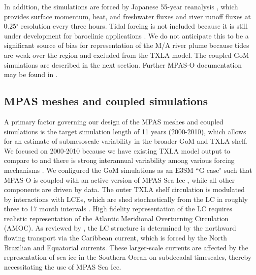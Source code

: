 In addition, the simulations are forced by Japanese 55-year reanalysis \citep[JRA-55, ][]{kobayashi2015jra}, which provides surface momentum, heat, and freshwater fluxes and river runoff fluxes at 0.25$^\circ$ resolution every three hours. Tidal forcing is not included because it is still under development for baroclinic applications \citep{barton2022global}. We do not anticipate this to be a significant source of bias for representation of the M/A river plume because tides are weak over the region \citep{DiMarco_1998} and excluded from the TXLA model. The coupled GoM simulations are described in the next section. Further MPAS-O documentation may be found in \cite{petersen2018mpas}.

\subsection{MPAS meshes and coupled simulations}
A primary factor governing our design of the MPAS meshes and coupled simulations is the target simulation length of 11 years (2000-2010), which allows for an estimate of submesoscale variability in the broader GoM and TXLA shelf. We focused on 2000-2010 because we have existing TXLA model output to compare to and there is strong interannual variability among various forcing mechanisms \citep[see Tab. 2 of ][]{forrest2011multivariable}. We configured the GoM simulations as an E3SM ``G case" such that MPAS-O is coupled with an active version of MPAS Sea Ice \citep{petersen2019evaluation, turner2022mpas}, while all other components are driven by data. The outer TXLA shelf circulation is modulated by interactions with LCEs, which are shed stochastically from the LC in roughly three to 17 month intervals \citep{oey2005loop}. High fidelity representation of the LC requires realistic representation of the Atlantic Meridional Overturning Circulation (AMOC). As reviewed by \cite{richardson2005caribbean}, the LC structure is determined by the northward flowing transport via the Caribbean current, which is forced by the North Brazilian and Equatorial currents. These larger-scale currents are affected by the representation of sea ice in the Southern Ocean on subdecadal timescales, thereby necessitating the use of MPAS Sea Ice.

